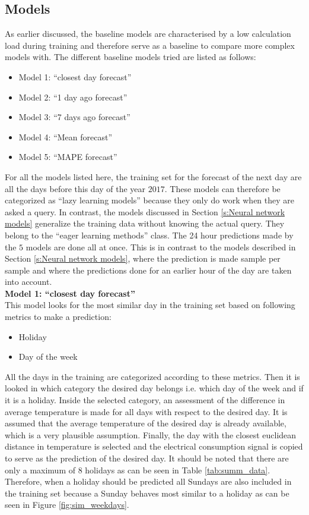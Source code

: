 \subsection{Models}
As earlier discussed, the baseline models are characterised by a low calculation load during training and therefore serve as a baseline to compare more complex models with. The different baseline models tried are listed as follows:
\begin{itemize}
	\item Model 1: ``closest day forecast''
	\item Model 2: ``1 day ago forecast''
	\item Model 3: ``7 days ago forecast''
	\item Model 4: ``Mean forecast''
	\item Model 5: ``MAPE forecast''
\end{itemize} 

For all the models listed here, the training set for the forecast of the next day are all the days before this day of the year $ 2017 $. These models can therefore be categorized as ``lazy learning models'' because they only do work when they are asked a query. In contrast, the models discussed in Section \ref{s:Neural network models} generalize the training data without knowing the actual query. They belong to the ``eager learning methods'' class. The 24 hour predictions made by the $ 5 $ models are done all at once. This is in contrast to the models described in Section \ref{s:Neural network models}, where the prediction is made sample per sample and where the predictions done for an earlier hour of the day are taken into account.\\

\textbf{Model 1: ``closest day forecast''}\\
This model looks for the most similar day in the training set based on following metrics to make a prediction:

\begin{itemize}
	\item Holiday
	\item Day of the week
\end{itemize}

 All the days in the training are categorized according to these metrics. Then it is looked in which category the desired day belongs i.e. which day of the week and if it is a holiday. Inside the selected category, an assessment of the difference in average temperature is made for all days with respect to the desired day. It is assumed that the average temperature of the desired day is already available, which is a very plausible assumption. Finally, the day with the closest euclidean distance in temperature is selected and the electrical consumption signal is copied to serve as the prediction of the desired day. It should be noted that there are only a maximum of $ 8 $ holidays as can be seen in Table \ref{tab:summ_data}. Therefore, when a holiday should be predicted all Sundays are also included in the training set because a Sunday behaves most similar to a holiday as can be seen in Figure \ref{fig:sim_weekdays}.\\
 
